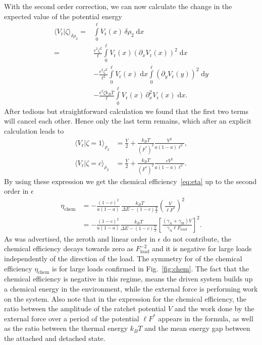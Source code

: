 \documentclass[aps,pre,twocolumn,showpacs,showkeys,superscriptaddress,floatfix]{revtex4-1}
\newcommand{\rmd}{{\mathrm d}}
\begin{document}
With the second order correction, we can now calculate the change in the expected value of the potential energy
\begin{align*}
\langle V_\text{r} | \zeta \rangle_{\delta\rho_2} 
=& \int\limits_0^\ell V_\text{r}(x) \, \delta\rho_2 \; \rmd x \\
=& \frac{\epsilon^2 \zeta^2}{\ell} \int\limits_0^\ell V_\text{r}(x) \left(\partial_x V_\text{r}(x) \right)^2 \; \rmd x  \\
&- \frac{\epsilon^2 \zeta^2}{\ell^2} \int\limits_0^\ell V_\text{r}(x) \; \rmd x \int\limits_0^\ell \left( \partial_y V_\text{r}(y) \right)^2 \; \rmd y \\
&- \frac{\epsilon^2 \zeta k_B T}{\ell} \int\limits_0^\ell V_\text{r}(x) \, \partial_x^2 V_\text{r}(x) \; \rmd x .
\end{align*}
After tedious but straightforward calculation we found that the first two terms will cancel each other. 
Hence only the last term remains, which after an explicit calculation leads to  
\begin{align*}
\langle V_\text{r} | \zeta = 1 \rangle_{\rho_2} &= \frac{V}{2} + \frac{k_B T}{(F^*)^2} \frac{V^2}{a \left(1-a\right) \ell^2 }, \\
\langle V_\text{r} | \zeta = c \rangle_{\rho_2} &= \frac{V}{2} + \frac{k_B T}{(F^*)^2} \frac{c V^2}{a \left(1-a\right) \ell^2 } .
\end{align*}
By using these expression we get the chemical efficiency~\eqref{eq:eta} up to the second order in $\epsilon$  
\begin{align*}
\eta_\text{chem} 
&= - \frac{ \left(1-c\right)^2 }{ a (1-a) } \, \frac{k_B T} { \Delta E - (1-c) \frac{V}{2} } \left( \frac{V}{\ell F^*} \right)^2 
\\
&= - \frac{ \left(1-c\right)^2 }{ a (1-a) } 
\frac{k_B T} { \Delta E - (1-c) \frac{V}{2} } 
\left[ \frac{ ( \gamma_\text{A} + \gamma_\text{M} ) V }{\gamma_\text{A} \ell F_\text{load}} \right]^2 .
\end{align*}
As was advertised, the zeroth and linear order in $\epsilon$ do not contribute, 
the chemical efficiency decays towards zero as $F_\text{load}^{-2}$ and it is negative for large loads independently of the direction of the load.
The symmetry for of the chemical efficiency $\eta_\text{chem}$ is for large loads confirmed in Fig.~\ref{fig:chem}. 
The fact that the chemical efficiency is negative in this regime, 
means the driven system builds up a chemical energy in the environment, while the external force is performing work on the system. 
Also note that in the expression for the chemical efficiency, 
the ratio between the amplitude of the ratchet potential $V$ and the work done by the external force over a period of the potential $\ell F^*$ appears in the formula, 
as well as the ratio between the thermal energy $k_B T$ and the mean energy gap between the attached and detached state. 
\end{document}
